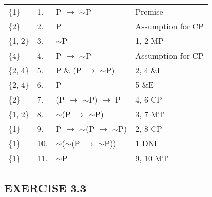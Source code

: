 \documentclass[a4paper,12pt]{article}
\newcommand{\mra}{$\rightarrow$ }
\newcommand{\ms}{$\sim$}
\begin{document}
\begin{enumerate}[label=\arabic*,leftmargin=*]
\begin{enumerate}[label=\arabic*.]
\begin{minipage}{\textwidth}
                    \vspace{1em}\\
                    \begin{tabular}{l l l l}
                        \{1\} & 1. & P \mra \ms P & Premise\\
                        \{2\} & 2. & P & Assumption for CP\\
                        \{1, 2\} & 3. & \ms P & 1, 2 MP\\
                        \{4\} & 4. & P \mra \ms P & Assumption for CP\\
                        \{2, 4\} & 5. & P \& (P \mra \ms P) & 2, 4 \&I\\
                        \{2, 4\} & 6. & P & 5 \&E\\
                        \{2\} & 7. & (P \mra \ms P) \mra P & 4, 6 CP\\
                        \{1, 2\} & 8. & \ms (P \mra \ms P) & 3, 7 MT\\
                        \{1\} & 9. & P \mra \ms (P \mra \ms P) & 2, 8 CP\\
                        \{1\} & 10. & \ms (\ms (P \mra \ms P)) & 1 DNI\\
                        \{1\} & 11. & \ms P & 9, 10 MT\\
                    \end{tabular}
                \end{minipage}

            \end{enumerate}
    \end{enumerate}

    \subsection*{EXERCISE 3.3}
\end{document}
